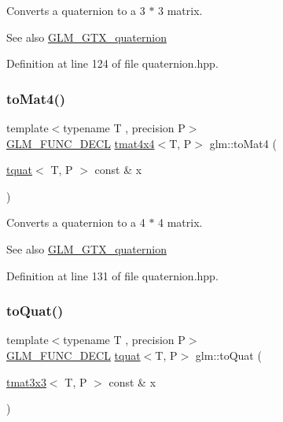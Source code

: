 Converts a quaternion to a 3 $\ast$ 3 matrix.

\begin{DoxySeeAlso}{See also}
\mbox{\hyperlink{group__gtx__quaternion}{G\+L\+M\+\_\+\+G\+T\+X\+\_\+quaternion}} 
\end{DoxySeeAlso}


Definition at line 124 of file quaternion.\+hpp.

\mbox{\label{group__gtx__quaternion_gaedc9fba6485eade37cc26c16df9d7aad}} 
\subsubsection{\texorpdfstring{toMat4()}{toMat4()}}
{\footnotesize\ttfamily template$<$typename T , precision P$>$ \\
\mbox{\hyperlink{setup_8hpp_ab2d052de21a70539923e9bcbf6e83a51}{G\+L\+M\+\_\+\+F\+U\+N\+C\+\_\+\+D\+E\+CL}} \mbox{\hyperlink{structglm_1_1tmat4x4}{tmat4x4}}$<$T, P$>$ glm\+::to\+Mat4 (\begin{DoxyParamCaption}\item[{\mbox{\hyperlink{structglm_1_1tquat}{tquat}}$<$ T, P $>$ const \&}]{x }\end{DoxyParamCaption})}

Converts a quaternion to a 4 $\ast$ 4 matrix.

\begin{DoxySeeAlso}{See also}
\mbox{\hyperlink{group__gtx__quaternion}{G\+L\+M\+\_\+\+G\+T\+X\+\_\+quaternion}} 
\end{DoxySeeAlso}


Definition at line 131 of file quaternion.\+hpp.

\mbox{\label{group__gtx__quaternion_gac9e3109ca60b644ce508d6b71a1697bc}} 
\subsubsection{\texorpdfstring{toQuat()}{toQuat()}\hspace{0.1cm}{\footnotesize\ttfamily [1/2]}}
{\footnotesize\ttfamily template$<$typename T , precision P$>$ \\
\mbox{\hyperlink{setup_8hpp_ab2d052de21a70539923e9bcbf6e83a51}{G\+L\+M\+\_\+\+F\+U\+N\+C\+\_\+\+D\+E\+CL}} \mbox{\hyperlink{structglm_1_1tquat}{tquat}}$<$T, P$>$ glm\+::to\+Quat (\begin{DoxyParamCaption}\item[{\mbox{\hyperlink{structglm_1_1tmat3x3}{tmat3x3}}$<$ T, P $>$ const \&}]{x }\end{DoxyParamCaption})}

